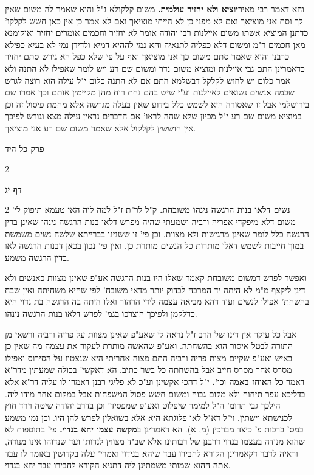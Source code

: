 \documentclass[12pt, openany]{book}
\newcommand{\sethebfont}{
\fontsize{10.5pt}{21.0pt} \selectfont
}
\newcommand{\twocol}[1]{
	{\sethebfont \begin{multicols}{2}
			#1
	\end{multicols}}	
}
\newcommand{\chapname}{}
\newcommand{\sectname}{}
\newcommand{\newchap}[1]{
	\addcontentsline{toc}{chapter}{#1}
	\renewcommand{\chapname}{#1}
		\begin{center}
			\textbf{%
\fontsize{16pt}{16pt}\selectfont
				#1}
		\end{center}
}
\newcommand{\newsection}[1]{
	\renewcommand{\sectname}{#1}	
	\vspace{-\baselineskip}
	\begin{center}
		\textbf{%
\fontsize{16pt}{16pt}\selectfont
			#1}
	\end{center}
	\vspace{-\baselineskip}
	\nopagebreak
}
\begin{document}
{ והא דאמר רבי מאיר\textbf{יוציא ולא יחזיר עולמית.} משום קלקולא נ"ל והוא שאמר לה משום שאין לך וסת אני מוציאך ואם לא מפני כן לא הייתי מוציאך ואם לא אמר כן אין כאן חשש לקלקו' כדתנן המוציא אשתו משום איילנות רבי יהודה אומר לא יחזיר וחכמים אומרים יחזיר ואוקימנא מאן חכמים ר"מ ומשום דלא כפליה לתנאיה והא נמי לההיא דמיא ולדידן נמי לא בעיא כפילא כרבנן והוא שאמר סתם משום כך אני מוציאך ואף על פי שלא כפל הא גירש סתם יחזיר כדאמרינן התם גבי איילנות ומוציא משום נדר ומשום שם רע ויש לומר שאפילו לא התנה ולא אמר כלום יש לחוש לקלקל דבשלמא התם אם לא התנה כלום י"ל עילה הוא רוצה לגרש שכמה אנשים נשואים לאיילנות וע"י שיש בהם נחת רוח מהן מקיימין אותם וכך אמרו שם בירושלמי אבל זו שאסורה היא לשמש כלל בידוע שאין בעלה מגרשה אלא מחמת פיסול זה וכן במוציא משום שם רע י"ל מכיון שלא שהה לראו' אם הדברים נראין עילה מצא וגורש לפיכך אין חוששין לקלקול אלא שאמר משום שם רע אני מוציאך. }

\newchap{פרק  כל היד}
\twocol{\clearpage}

\newsection{דף יג}
\twocol{\textbf{נשים דלאו בנות הרגשה נינהו משובחת.} ק"ל לר"ת ז"ל למה ליה האי טעמא תיפוק לי' משום דלא מיפקדי אפריה ורביה ושמעתי שהיה מפרש דלאו בנות הרגשה נינהו שאינן בדין הרגשה כלל לומר שאינן מרגישות ולא מצוות. וכן פי' זו ששנינו בברייתא שלשה נשים משמשת במוך חייבות לשמש דאלו מותרות כל הנשים מותרת כן. ואין פי' נכון בכאן דבנות הרגשה לאו בדין הרגשה משמע.\par ואפשר לפרש דמשום משובחת קאמר שאלו היו בנות הרגשה אע"פ שאינן מצוות כאנשים ולא דינן ליקצף מ"מ לא היתה יד המרבה לבדוק יותר מדאי משובח' לפי שהיא משחיתה ואין שבח בהשחת' אפילו לנשים ועוד דהא מביאה עצמה לידי הרהור ואלו היתה בה הרגשה בת נדוי היא כדלקמן ולפיכך הוצרכו בגמ' לפרש דלאו בנות הרגשה נינהו.\par אבל כל עיקר אין דינו של הרב ז"ל נראה לי שאע"פ שאינן מצוות על פריה ורביה ורשאי מן התורה לבטל איסור הוא בהשחתה. ואע"פ שהאשה מותרת לעקור את עצמה מה שאין כן באיש ואע"פ שקיים מצות פריה ורביה התם מצוה אחריתי היא שנצטוו על הסירוס ואפילו מסרס אחר מסרס חייב אבל בהשחתה כל בשר כתיב. 
הא דאקשי' בכולה שמעתין מדר"א דאמר \textbf{כל האוחז באמה וכו'.} י"ל דהכי אקשינן וע"כ לא פליגי רבנן דאמרו לו עליה דר"א אלא בדליכא עפר תיחוח ולא מקום גבוה ומשום חשש פסול המשפחות אבל במקום אחר מודו ליה. הילכך גבי תרומ' ה"ל למימר שיפלוט ואע"פ שמפסיד' וכן בדרב יהודה שיטה וירד חוץ לכנישתא וישתין. וי"ל דא"ל לאו פלוגתא היא אלא בשואלין לפרש להן היו. וכן נמי משמע במס' ברכות פ' כיצד מברכין (מ, א). 
הא דאמרינן ב\textbf{מקשה עצמו יהא בנדוי.} פי' בתוספות לא שהוא מנודה בעצמו בנדוי דרבנן של רבותינו אלא שב"ד מצווין לנדותו ועד שנדוהו אינו מנודה, וראיה לדבר דקאמרינן הקורא לחבירו עבד שיהא בנידוי ואמרי' עלה בקדושין באומר לו עבד אתה ההוא שמותי משמתינן ליה דתניא הקורא לחבירו עבד יהא בנדוי. 
\clearpage}
\end{document}
